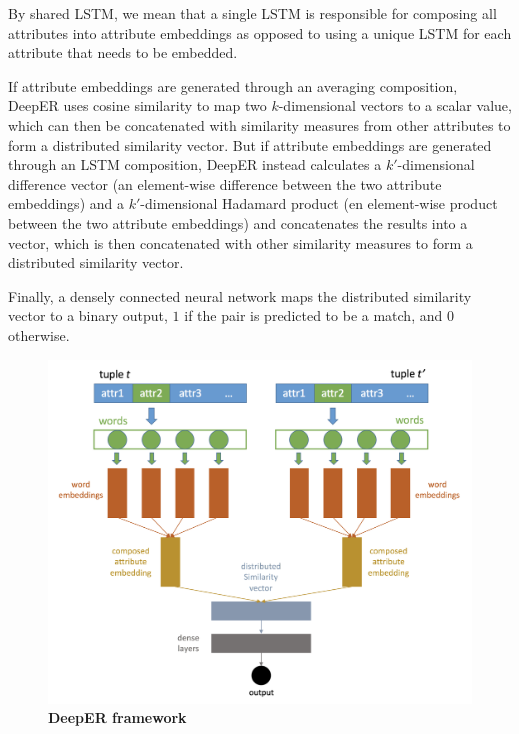 \documentclass{proc}
\begin{document}
By shared LSTM, we mean that a single LSTM is responsible for composing all attributes into attribute embeddings as opposed to using a unique LSTM for each attribute that needs to be embedded.

If attribute embeddings are generated through an averaging composition, DeepER uses cosine similarity to map two $k$-dimensional vectors to a scalar value, which can then be concatenated with similarity measures from other attributes to form a distributed similarity vector. But if attribute embeddings are generated through an LSTM composition, DeepER instead calculates a $k'$-dimensional difference vector (an element-wise difference between the two attribute embeddings) and a $k'$-dimensional Hadamard product (en element-wise product between the two attribute embeddings) and concatenates the results into a vector, which is then concatenated with other similarity measures to form a distributed similarity vector.

Finally, a densely connected neural network maps the distributed similarity vector to a binary output, $1$ if the pair is predicted to be a match, and $0$ otherwise.

\begin{figure}
	\includegraphics[scale=0.33]{../imgs/deep-er-framework.png}
	\caption{\textbf{DeepER framework}}
	\label{fig:deep-er-framework}
\end{figure}
\end{document}

